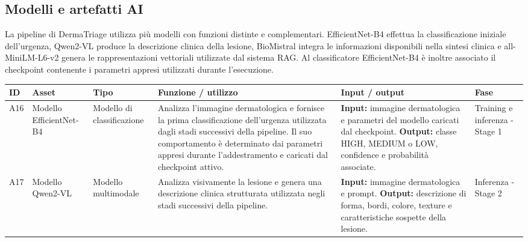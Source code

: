 \subsection{Modelli e artefatti AI}
La pipeline di DermaTriage utilizza più modelli con funzioni distinte e complementari. EfficientNet-B4 effettua la classificazione iniziale dell'urgenza, Qwen2-VL produce la descrizione clinica della lesione, BioMistral integra le informazioni disponibili nella sintesi clinica e all-MiniLM-L6-v2 genera le rappresentazioni vettoriali utilizzate dal
sistema RAG. Al classificatore EfficientNet-B4 è inoltre associato il checkpoint contenente i parametri appresi utilizzati durante l'esecuzione.

\begin{table}[H]
    \centering
    \small
    \setlength{\tabcolsep}{4pt}
    \renewcommand{\arraystretch}{1.08}

    \begin{tabularx}{\textwidth}{
        >{\raggedright\arraybackslash}p{0.6cm}
        >{\raggedright\arraybackslash}p{2.5cm}
        >{\raggedright\arraybackslash}p{1.6cm}
        X
        X
        >{\raggedright\arraybackslash}p{1.8cm}
    }
        \toprule

        \textbf{ID} &
        \textbf{Asset} &
        \textbf{Tipo} &
        \textbf{Funzione / utilizzo} &
        \textbf{Input / output} &
        \textbf{Fase} \\

        \midrule

        A16 &
        Modello EfficientNet-B4 &
        Modello di classificazione &
        Analizza l'immagine dermatologica e fornisce la prima classificazione
        dell'urgenza utilizzata dagli stadi successivi della pipeline. Il suo
        comportamento è determinato dai parametri appresi durante l'addestramento
        e caricati dal checkpoint attivo. &
        \textbf{Input:} immagine dermatologica e parametri del modello caricati
        dal checkpoint.
        \textbf{Output:} classe HIGH, MEDIUM o LOW, confidence e probabilità
        associate. &
        Training e inferenza - Stage 1 \\

        \midrule

        A17 &
        Modello Qwen2-VL &
        Modello multimodale &
        Analizza visivamente la lesione e genera una descrizione clinica
        strutturata utilizzata negli stadi successivi della pipeline. &
        \textbf{Input:} immagine dermatologica e prompt.
        \textbf{Output:} descrizione di forma, bordi, colore, texture e
        caratteristiche sospette della lesione. &
        Inferenza - Stage 2 \\


\end{tabularx}
\end{table}
